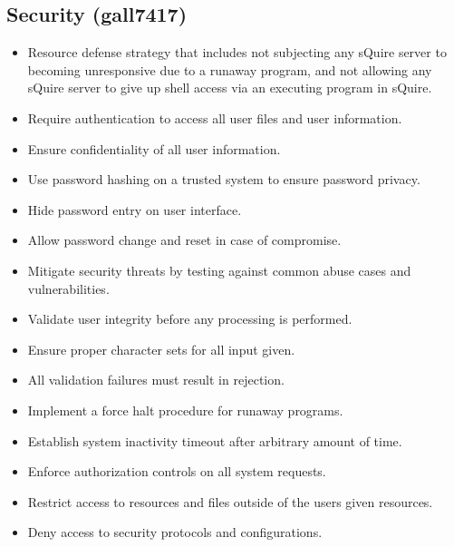 \documentclass[11pt]{report}
\begin{document}
    \subsection{Security (gall7417)}
        \begin{itemize}
            \item Resource defense strategy that includes not subjecting any sQuire server to becoming unresponsive due to a runaway program, and not allowing any sQuire server to give up shell access via an executing program in sQuire.
            \item Require authentication to access all user files and user information.
            \item Ensure confidentiality of all user information.
            \item Use password hashing on a trusted system to ensure password privacy.
            \item Hide password entry on user interface.
            \item Allow password change and reset in case of compromise.
            \item Mitigate security threats by testing against common abuse cases and vulnerabilities.
            \item Validate user integrity before any processing is performed.
            \item Ensure proper character sets for all input given.
            \item All validation failures must result in rejection.
            \item Implement a force halt procedure for runaway programs.
            \item Establish system inactivity timeout after arbitrary amount of time.
            \item Enforce authorization controls on all system requests.
            \item Restrict access to resources and files outside of the users given resources.
            \item Deny access to security protocols and configurations.
        \end{itemize}

    
\end{document}
